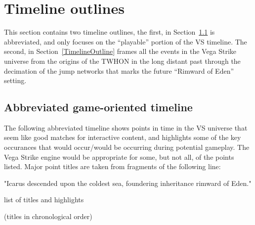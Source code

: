 \label{chapt:timelines}
\section{Timeline outlines}

This section contains two timeline outlines, the first, in
Section~\ref{Abbrevtimeline} is abbreviated, and only focuses on the
``playable'' portion of the VS timeline. The second, in
Section~\ref{TimelineOutline} frames all the events in the Vega Strike
universe from the origins of the TWHON in the long distant past
through the decimation of the jump networks that marks the future
``Rimward of Eden'' setting.


\subsection{Abbreviated game-oriented timeline}
\label{Abbrevtimeline}
The following abbreviated timeline shows points in time in the VS
universe that seem like good matches for interactive content, and
highlights some of the key occurances that would occur/would be
occurring during potential gameplay. The Vega Strike engine would be
appropriate for some, but not all, of the points listed. Major point
titles are taken from fragments of the following line:

{\Large \centerline{"Icarus descended upon the coldest sea, foundering inheritance rimward of Eden."}}
list of titles and highlights

(titles in chronological order)

